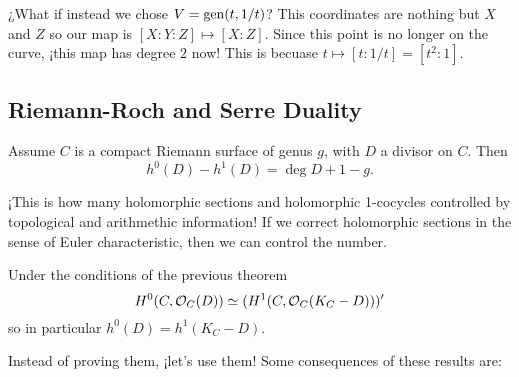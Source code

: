 \documentclass[12pt]{memoir}
\begin{document}
\begin{Ex}
    ¿What if instead we chose $V=\operatorname{gen}(t,1/t)$? This coordinates are nothing but $X$ and $Z$ so our map is $[X:Y:Z]\mapsto [X:Z]$. Since this point is no longer on the curve, ¡this map has degree $2$ now! This is becuase $t\mapsto [t:1/t]=[t^2:1]$.
    \begin{center}
    \end{center}
\end{Ex}

\subsection{Riemann-Roch and Serre Duality}

\begin{Th}
    Assume $C$ is a compact Riemann surface of genus $g$, with $D$ a divisor on $C$. Then 
    $$h^0(D)-h^1(D)=\deg D+1-g.$$
\end{Th}

¡This is how many holomorphic sections and holomorphic 1-cocycles controlled by topological and arithmethic information! If we correct holomorphic sections in the sense of Euler characteristic, then we can control the number.

\begin{Th}
    Under the conditions of the previous theorem
    $$H^0(C,\mathcal{O}_C(D))\simeq (H^1(C,\mathcal{O}_C(K_C-D)))'$$
    so in particular $h^0(D)=h^1(K_C-D)$.
\end{Th}

Instead of proving them, ¡let's use them! Some consequences of these results are:
\end{document}
